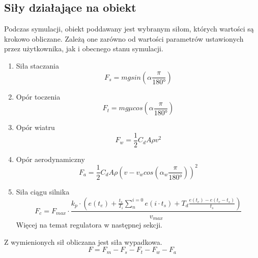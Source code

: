 \documentclass[12pt,a4paper]{article}
\begin{document}
	\subsection{Siły działające na obiekt}
	Podczas symulacji, obiekt poddawany jest wybranym siłom, których wartości są krokowo obliczane. Zależą one zarówno od wartości parametrów ustawionych przez użytkownika, jak i obecnego stanu symulacji.
	\begin{enumerate}
		\item Siła staczania
		\[
			F_s = mgsin\left(\alpha\frac{\pi}{180°}\right)
		\]
		\item Opór toczenia
		\[
			F_t = mg\mu cos\left(\alpha\frac{\pi}{180°}\right)
		\]
		\item Opór wiatru
		\[
			F_w = \frac{1}{2} C_d A \rho v^2
		\]
		\item Opór aerodynamiczny
		\[
			F_a = \frac{1}{2} C_d A \rho (v - v_wcos(\alpha_w\frac{\pi}{180°}))^2
		\]
		\item Siła ciągu silnika
		\[
			F_c = F_{max} \cdot \frac{k_p \cdot \left(e(t_e) + \frac{t_s}{T_i}\sum_{n}^{i=0}e(i \cdot t_s) + T_d \frac{e(t_e) - e(t_e - t_s)}{t_s}\right)}{v_{max}}
		\]
		Więcej na temat regulatora w następnej sekcji.
	\end{enumerate}
	Z wymienionych sił obliczana jest siła wypadkowa.
	\[
		F = F_m - F_s - F_t - F_w - F_a
	\]
\end{document}

